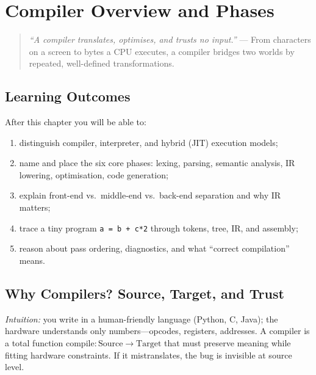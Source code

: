 \chapter{Compiler Overview and Phases}
\label{ch:overview}

\begin{quote}
\emph{``A compiler translates, optimises, and trusts no input.''} --- From characters on a screen to bytes a CPU executes, a compiler bridges two worlds by repeated, well-defined transformations.
\end{quote}

\noindent{}
\vspace{0.4em}

\section*{Learning Outcomes}
After this chapter you will be able to:
\begin{enumerate}[label=(L\arabic*)]
    \item distinguish compiler, interpreter, and hybrid (JIT) execution models;
    \item name and place the six core phases: lexing, parsing, semantic analysis, IR lowering, optimisation, code generation;
    \item explain front-end vs.\ middle-end vs.\ back-end separation and why IR matters;
    \item trace a tiny program \texttt{a = b + c*2} through tokens, tree, IR, and assembly;
    \item reason about pass ordering, diagnostics, and what ``correct compilation'' means.
\end{enumerate}

\section{Why Compilers? Source, Target, and Trust}
\label{sec:why-compilers}
\emph{Intuition:} you write in a human-friendly language (Python, C, Java); the hardware understands only numbers---opcodes, registers, addresses. A compiler is a total function $\text{compile}: \text{Source} \to \text{Target}$ that must preserve meaning while fitting hardware constraints. If it mistranslates, the bug is invisible at source level.

